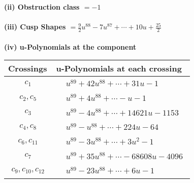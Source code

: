 \documentclass[1p]{elsarticle_modified}
\theoremstyle{definition}
\begin{document}
\flushleft \textbf{(ii) Obstruction class $= -1$}\\~\\
\flushleft \textbf{(iii) Cusp Shapes $= \frac{9}{2} u^{88}-7 u^{87}+\cdots+10 u+\frac{25}{2}$}\\~\\
\newpage\renewcommand{\arraystretch}{1}
\flushleft \textbf{(iv) u-Polynomials at the component}\newline \\
\begin{tabular}{m{50pt}|m{274pt}}
Crossings & \hspace{64pt}u-Polynomials at each crossing \\
\hline $$\begin{aligned}c_{1}\end{aligned}$$&$\begin{aligned}
&u^{89}+42 u^{88}+\cdots+31 u-1
\end{aligned}$\\
\hline $$\begin{aligned}c_{2},c_{5}\end{aligned}$$&$\begin{aligned}
&u^{89}+4 u^{88}+\cdots- u-1
\end{aligned}$\\
\hline $$\begin{aligned}c_{3}\end{aligned}$$&$\begin{aligned}
&u^{89}-4 u^{88}+\cdots+14621 u-1153
\end{aligned}$\\
\hline $$\begin{aligned}c_{4},c_{8}\end{aligned}$$&$\begin{aligned}
&u^{89}- u^{88}+\cdots+224 u-64
\end{aligned}$\\
\hline $$\begin{aligned}c_{6},c_{11}\end{aligned}$$&$\begin{aligned}
&u^{89}-3 u^{88}+\cdots+3 u^2-1
\end{aligned}$\\
\hline $$\begin{aligned}c_{7}\end{aligned}$$&$\begin{aligned}
&u^{89}+35 u^{88}+\cdots-68608 u-4096
\end{aligned}$\\
\hline $$\begin{aligned}c_{9},c_{10},c_{12}\end{aligned}$$&$\begin{aligned}
&u^{89}-23 u^{88}+\cdots+6 u-1
\end{aligned}$\\
\hline
\end{tabular}\\~\\
\end{document}
